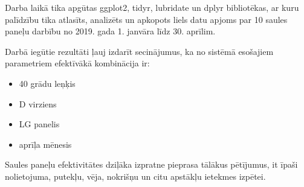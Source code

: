 Darba laikā tika apgūtas ggplot2, tidyr, lubridate un dplyr bibliotēkas, ar kuru palīdzību tika atlasīts, analizēts un apkopots liels datu apjoms par 10 saules paneļu darbību no 2019. gada 1. janvāra līdz 30. aprīlim.

Darbā iegūtie rezultāti ļauj izdarīt secinājumus, ka no sistēmā esošajiem parametriem efektīvākā kombinācija ir:
\begin{itemize}
	\item 40 grādu leņķis
	\item D virziens
	\item LG panelis
	\item aprīļa mēnesis
\end{itemize}


Saules paneļu efektivitātes dziļāka izpratne pieprasa tālākus pētījumus, it īpaši nolietojuma, putekļu, vēja, nokrišņu un citu apstākļu ietekmes izpētei.